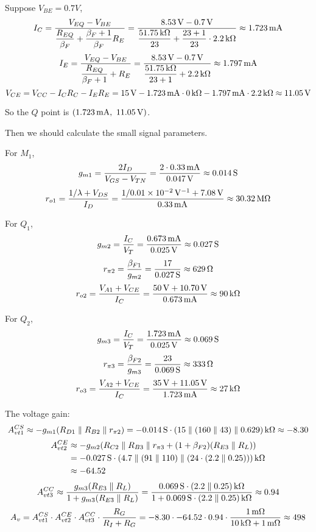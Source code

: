 \documentclass{article}
\newcommand{\unit}[1]{{\rm\,#1}}
\begin{document}
\begin{enumerate}[(1)]
Suppose $V_{BE}=0.7V$,
$$I_C=\frac{V_{EQ}-V_{BE}}{\dfrac{R_{EQ}}{\beta_F}+\dfrac{\beta_F+1}{\beta_F}R_E}=\frac{8.53\unit{V}-0.7\unit{V}}{\dfrac{51.75\unit{k\Omega}}{23}+\dfrac{23+1}{23}\cdot2.2\unit{k\Omega}}\approx1.723\unit{mA}$$
$$I_E=\frac{V_{EQ}-V_{BE}}{\dfrac{R_{EQ}}{\beta_F+1}+R_E}=\frac{8.53\unit{V}-0.7\unit{V}}{\dfrac{51.75\unit{k\Omega}}{23+1}+2.2\unit{k\Omega}}\approx1.797\unit{mA}$$
$$V_{CE}=V_{CC}-I_CR_C-I_ER_E=15\unit{V}-1.723\unit{mA}\cdot0\unit{k\Omega}-1.797\unit{mA}\cdot2.2\unit{k\Omega}\approx11.05\unit{V}$$

So the $Q$ point is $(1.723\unit{mA},\ 11.05\unit{V})$.

\end{enumerate}

Then we should calculate the small signal parameters.

For $M_1$, $$g_{m1}=\frac{2I_D}{V_{GS}-V_{TN}}=\frac{2\cdot0.33\unit{mA}}{0.047\unit{V}}\approx0.014\unit{S}$$
$$r_{o1}=\frac{1/\lambda+V_{DS}}{I_D}=\frac{1/0.01\times10^{-2}\unit{V^{-1}}+7.08\unit{V}}{0.33\unit{mA}}\approx30.32\unit{M\Omega}$$

For $Q_1$, $$g_{m2}=\frac{I_C}{V_T}=\frac{0.673\unit{mA}}{0.025\unit{V}}\approx0.027\unit{S}$$
$$r_{\pi2}=\frac{\beta_{F1}}{g_{m2}}=\frac{17}{0.027\unit{S}}\approx629\unit{\Omega}$$
$$r_{o2}=\frac{V_{A1}+V_{CE}}{I_C}=\frac{50\unit{V}+10.70\unit{V}}{0.673\unit{mA}}\approx90\unit{k\Omega}$$

For $Q_2$, $$g_{m3}=\frac{I_C}{V_T}=\frac{1.723\unit{mA}}{0.025\unit{V}}\approx0.069\unit{S}$$
$$r_{\pi3}=\frac{\beta_{F2}}{g_{m3}}=\frac{23}{0.069\unit{S}}\approx333\unit{\Omega}$$
$$r_{o3}=\frac{V_{A2}+V_{CE}}{I_C}=\frac{35\unit{V}+11.05\unit{V}}{1.723\unit{mA}}\approx27\unit{k\Omega}$$

The voltage gain:
$$A_{vt1}^{CS}\approx-g_{m1}(R_{D1}\parallel R_{B2}\parallel r_{\pi2})=-0.014\unit{S}\cdot(15\parallel(160\parallel43)\parallel0.629)\unit{k\Omega}\approx-8.30$$
\begin{align*}
A_{vt2}^{CE}&\approx-g_{m2}(R_{C2}\parallel R_{B3}\parallel r_{\pi3}+(1+\beta_{F2})(R_{E3}\parallel R_L))\\
&=-0.027\unit{S}\cdot(4.7\parallel(91\parallel110)\parallel(24\cdot(2.2\parallel0.25)))\unit{k\Omega}\\
&\approx-64.52
\end{align*}
$$A_{vt3}^{CC}\approx\frac{g_{m3}(R_{E3}\parallel R_L)}{1+g_{m3}(R_{E3}\parallel R_L)}=\frac{0.069\unit{S}\cdot(2.2\parallel0.25)\unit{k\Omega}}{1+0.069\unit{S}\cdot(2.2\parallel0.25)\unit{k\Omega}}\approx0.94$$
$$A_v=A_{vt1}^{CS}\cdot A_{vt2}^{CE}\cdot A_{vt3}^{CC}\cdot\frac{R_G}{R_I+R_G}=-8.30\cdot-64.52\cdot0.94\cdot\frac{1\unit{m\Omega}}{10\unit{k\Omega}+1\unit{m\Omega}}\approx498$$
\end{document}
